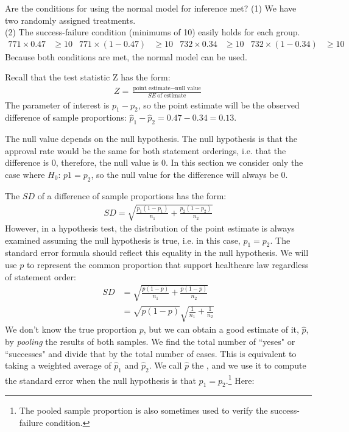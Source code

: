 \begin{examplewrap}
\begin{nexample}{Are the conditions for using the normal model for inference met?  }
\label{}
(1) We have two randomly assigned treatments.\\
(2) The success-failure condition (minimums of 10) easily holds for each group.
\begin{align*}
771 \times 0.47 &\ge 10
	&771 \times (1-0.47) &\ge 10
	&732 \times 0.34 &\ge 10
	&732 \times (1-0.34) &\ge 10
\end{align*}
Because both conditions are met, the normal model can be used.  
\end{nexample}
\end{examplewrap}


Recall that the test statistic Z has the form:
\begin{align*}
Z = \frac{\text{point estimate} - \text{null value}}{SE\ \text{of estimate}}
\end{align*}
The parameter of interest is $p_1-p_2$, so the point estimate will be the observed difference of sample proportions:  $\hat{p}_{1} - \hat{p}_{2} = 0.47 - 0.34 = 0.13$.  

The null value depends on the null hypothesis.  The null hypothesis is that the approval rate would be the same for both statement orderings, i.e. that the difference is 0, therefore, the null value is 0.  In this section we consider only the case where $H_0$: $p1=p_2$, so the null value for the difference will always be 0.

The $SD$ of a difference of sample proportions has the form:
\begin{align*}
SD = \sqrt{\frac{p_1(1-p_1)}{n_1} + \frac{p_2(1-p_2)}{n_2}}
\end{align*}
However, in a hypothesis test, the distribution of the point estimate is always examined assuming the null hypothesis is true, i.e. in this case, $p_1 = p_2$. The standard error formula should reflect this equality in the null hypothesis. We will use $p$ to represent the common proportion that support healthcare law regardless of statement order:
\begin{align*}
SD &= \sqrt{\frac{p(1-p)}{n_1} + \frac{p(1-p)}{n_2}} \\
	&= \sqrt{p(1-p)}\sqrt{\frac{1}{n_1} + \frac{1}{n_2}}
\end{align*}
We don't know the true proportion $p$, but we can obtain a good estimate of it, $\hat{p}$, by \emph{pooling} the results of both samples.  We find the total number of ``yeses" or ``successes" and divide that by the total number of cases.  This is equivalent to taking a weighted average of $\hat{p}_1$ and $\hat{p}_2$.  We call $\hat{p}$ the , and we use it to compute the standard error when the null hypothesis is that $p_1 = p_2$.\footnote{The pooled sample proportion is also sometimes used to verify the success-failure condition.} Here:

